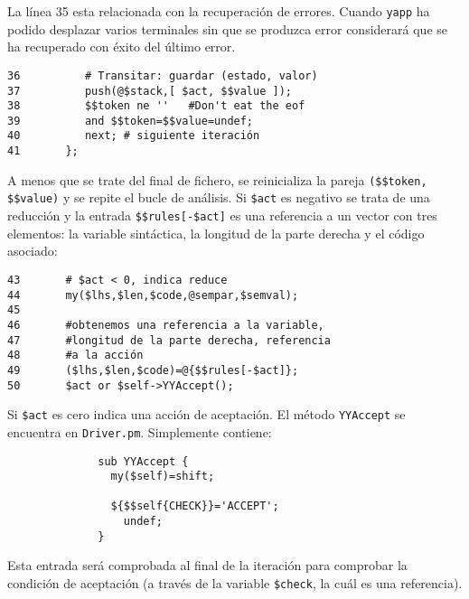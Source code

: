 La línea 35 esta relacionada con la recuperación de errores.
Cuando \verb|yapp| ha podido desplazar varios terminales
sin que se produzca error considerará que se ha recuperado 
con éxito del último error.
\begin{verbatim}
36          # Transitar: guardar (estado, valor)
37          push(@$stack,[ $act, $$value ]);
38          $$token ne ''   #Don't eat the eof
39          and $$token=$$value=undef;
40          next; # siguiente iteración
41       };
\end{verbatim}
A menos que se trate del final de fichero, se reinicializa
la pareja \verb|($$token, $$value)| y se repite el bucle
de análisis.
Si \verb|$act| es negativo se trata de una reducción
y la entrada \verb|$$rules[-$act]| es una referencia
a un vector con tres elementos: la variable sintáctica,
la longitud de la parte derecha y el código asociado:
\begin{verbatim}
43       # $act < 0, indica reduce
44       my($lhs,$len,$code,@sempar,$semval);
45 
46       #obtenemos una referencia a la variable,
47       #longitud de la parte derecha, referencia
48       #a la acción
49       ($lhs,$len,$code)=@{$$rules[-$act]};
50       $act or $self->YYAccept();
\end{verbatim}
Si \verb|$act| es cero indica una acción de aceptación.
El método \verb|YYAccept| se encuentra en \verb|Driver.pm|.
Simplemente contiene:

\begin{verbatim}
              sub YYAccept {
                my($self)=shift;

                ${$$self{CHECK}}='ACCEPT';
                  undef;
              }
\end{verbatim}

Esta entrada será comprobada al final de la iteración para comprobar
la condición de aceptación (a través de la 
variable \verb|$check|, la cuál es una referencia).

